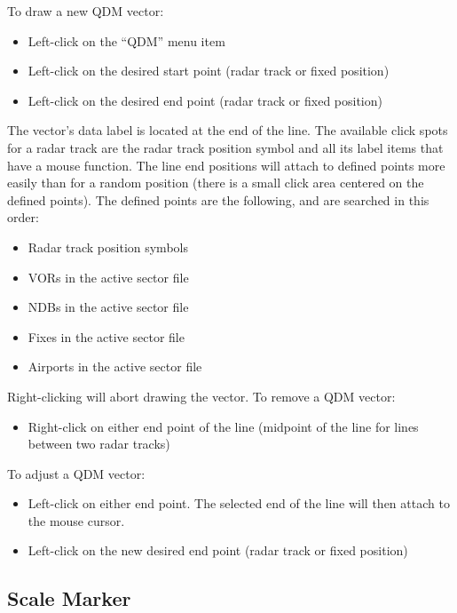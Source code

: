 \documentclass[11pt,a4paper]{memoir}
\begin{document}
To draw a new QDM vector:
\begin{itemize}
    \item Left-click on the “QDM” menu item
    \item Left-click on the desired start point (radar track or fixed position)
    \item Left-click on the desired end point (radar track or fixed position)
\end{itemize}

The vector’s data label is located at the end of the line. The available click spots for a radar track are the radar track position symbol and all its label items that have a mouse function.
The line end positions will attach to defined points more easily than for a random position (there is a small click area centered on the defined points). The defined points are the following, and are searched in this order:

\begin{itemize}
    \item Radar track position symbols
    \item VORs in the active sector file
    \item NDBs in the active sector file
    \item Fixes in the active sector file
    \item Airports in the active sector file
\end{itemize}

Right-clicking will abort drawing the vector.
To remove a QDM vector:

\begin{itemize}
    \item Right-click on either end point of the line (midpoint of the line for lines between two radar tracks)
\end{itemize}

To adjust a QDM vector:

\begin{itemize}
    \item Left-click on either end point. The selected end of the line will then attach to the mouse cursor.
    \item Left-click on the new desired end point (radar track or fixed position)
\end{itemize}

\subsection{Scale Marker}
\label{scale}
\end{document}
